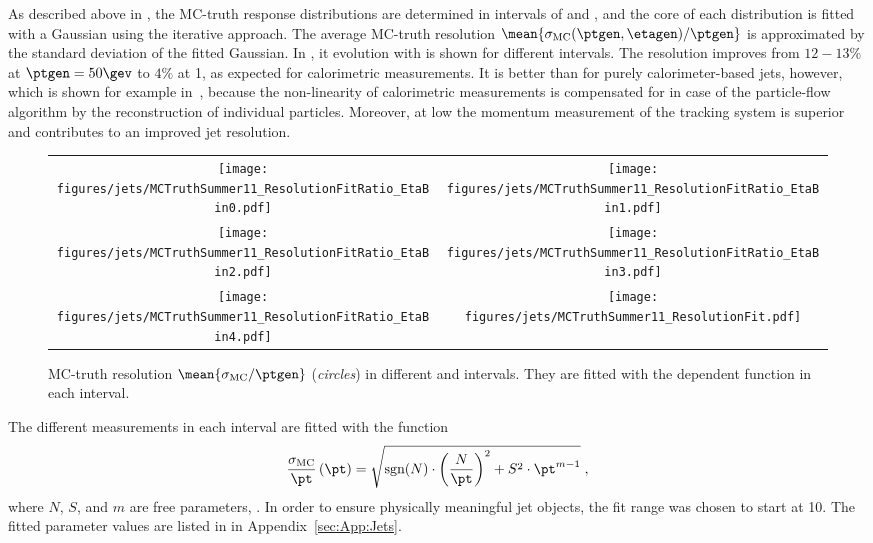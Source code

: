 As described above in , the MC-truth response distributions are determined in intervals of \ptgen and \etagen, and the core of each distribution is fitted with a Gaussian using the iterative approach.
The average MC-truth resolution \mbox{$\mean{\sigma_{\text{MC}}(\ptgen,\etagen)/\ptgen}$} is approximated by the standard deviation of the fitted Gaussian.
In , it evolution with \ptgen is shown for different \etagen intervals.
The resolution improves from $12-13\%$ at \mbox{$\ptgen = 50\gev$} to $4\%$ at 1\tev, as expected for calorimetric measurements.
It is better than for purely calorimeter-based jets, however, which is shown for example in~\cite{1748-0221-6-11-P11002}, because the non-linearity of calorimetric measurements is compensated for in case of the particle-flow algorithm by the reconstruction of individual particles.
Moreover, at low \pt the momentum measurement of the tracking system is superior and contributes to an improved jet resolution.
\begin{figure}[!ht]
  \centering
  \begin{tabular}{cc}
    \texttt{[image: figures/jets/MCTruthSummer11\_ResolutionFitRatio\_EtaBin0.pdf]} &
    \texttt{[image: figures/jets/MCTruthSummer11\_ResolutionFitRatio\_EtaBin1.pdf]} \\
    \texttt{[image: figures/jets/MCTruthSummer11\_ResolutionFitRatio\_EtaBin2.pdf]} &
    \texttt{[image: figures/jets/MCTruthSummer11\_ResolutionFitRatio\_EtaBin3.pdf]} \\
    \texttt{[image: figures/jets/MCTruthSummer11\_ResolutionFitRatio\_EtaBin4.pdf]} &
    \texttt{[image: figures/jets/MCTruthSummer11\_ResolutionFit.pdf]} \\
  \end{tabular}
  \caption{MC-truth resolution \mbox{$\mean{\sigma_{\text{MC}}/\ptgen}$} (\textit{circles}) in different \ptgen and \etagen intervals.
    They are fitted with the \ptgen dependent function  in each \etagen interval.
  }
  \label{fig:Jets:Resolution:MCTruth:Resolution}
\end{figure}

The different measurements in each \etagen interval are fitted with the function
\begin{equation}
  \label{eq:Jets:Resolution:MCTruth:Parametrisation}
  \frac{\sigma_{\text{MC}}}{\pt}\left(\pt\right) = \sqrt{\text{sgn}(N)\cdot\left(\frac{N}{\pt}\right)^{2} + S^{2}\cdot\pt^{m-1}} \;,
\end{equation}
where $N$, $S$, and $m$ are free parameters, .
In order to ensure physically meaningful jet objects, the fit range was chosen to start at 10\gev.
The fitted parameter values are listed in  in Appendix~\ref{sec:App:Jets}.

